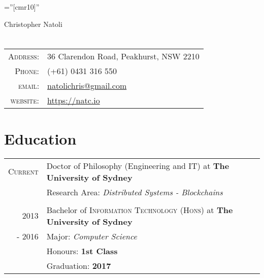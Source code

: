 \documentclass[10pt]{article}
\begin{document}

\pagestyle{empty} %

\font\fb=''[cmr10]'' %

\par{\centering
		{\Huge Christopher Natoli
	}\bigskip\par}

\vspace*{-0.6cm}
\section{}

\begin{tabular}{rl}
    \textsc{Address:}   & 36 Clarendon Road, Peakhurst, NSW 2210\\
    \textsc{Phone:}     & (+61) 0431 316 550\\
    \textsc{email:}     & \href{natolichris@gmail.com}{natolichris@gmail.com} \\
    \textsc{website:} & \href{https://natc.io}{https://natc.io}\\
\end{tabular}
\vspace*{0.3cm}
%
%
%
%
\section{Education}
\begin{tabular}{rl}	
\textsc{Current} & Doctor of Philosophy (Engineering and IT) at \textbf{The University of Sydney} \\
	& Research Area: \emph{Distributed Systems - Blockchains}\\\multicolumn{2}{c}{}\\
2013 & Bachelor of \textsc{Information Technology (Hons)} at \textbf{The University of Sydney} \\
- 2016 & Major: \emph{Computer Science}\\
	& Honours: \textbf{1st Class}\\
& Graduation: \textbf{2017}\\

\end{tabular}
\end{document}
